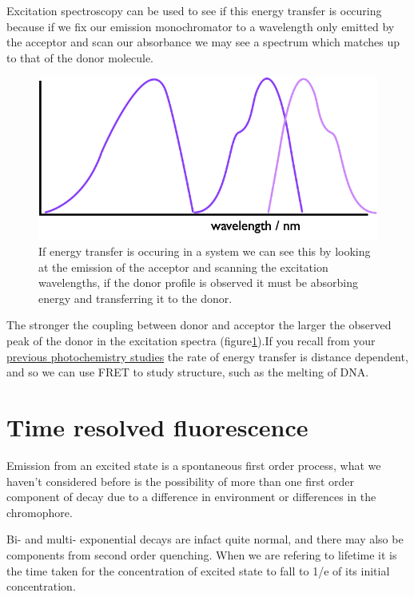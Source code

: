 \documentclass[
]{book}
\begin{document}
Excitation spectroscopy can be used to see if this energy transfer is occuring because if we fix our emission monochromator to a wavelength only emitted by the acceptor and scan our absorbance we may see a spectrum which matches up to that of the donor molecule.

\begin{figure}

{\centering \includegraphics[width=0.6\linewidth]{images/FRET2} 

}

\caption{If energy transfer is occuring in a system we can see this by looking at the emission of the acceptor and scanning the excitation wavelengths, if the donor profile is observed it must be absorbing energy and transferring it to the donor.}\label{fig:FRET2}
\end{figure}

The stronger the coupling between donor and acceptor the larger the observed peak of the donor in the excitation spectra (figure\ref{fig:FRET2}).If you recall from your \href{https://chemfd.github.io/Photochemistry_2/ch-Quench.html\#sec:forster}{previous photochemistry studies} the rate of energy transfer is distance dependent, and so we can use FRET to study structure, such as the melting of DNA.

\hypertarget{time-resolved-fluorescence}{%
\section{Time resolved fluorescence}\label{time-resolved-fluorescence}}

Emission from an excited state is a spontaneous first order process, what we haven't considered before is the possibility of more than one first order component of decay due to a difference in environment or differences in the chromophore.

Bi- and multi- exponential decays are infact quite normal, and there may also be components from second order quenching. When we are refering to lifetime it is the time taken for the concentration of excited state to fall to 1/e of its initial concentration.
\end{document}
